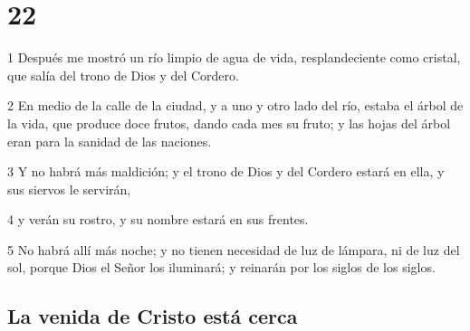\chapter{22}


\par 1 Después me mostró un río limpio de agua de vida, resplandeciente como cristal, que salía del trono de Dios y del Cordero.
\par 2 En medio de la calle de la ciudad, y a uno y otro lado del río, estaba el árbol de la vida, que produce doce frutos, dando cada mes su fruto; y las hojas del árbol eran para la sanidad de las naciones.
\par 3 Y no habrá más maldición; y el trono de Dios y del Cordero estará en ella, y sus siervos le servirán,
\par 4 y verán su rostro, y su nombre estará en sus frentes.
\par 5 No habrá allí más noche; y no tienen necesidad de luz de lámpara, ni de luz del sol, porque Dios el Señor los iluminará; y reinarán por los siglos de los siglos.

\section*{La venida de Cristo está cerca}

